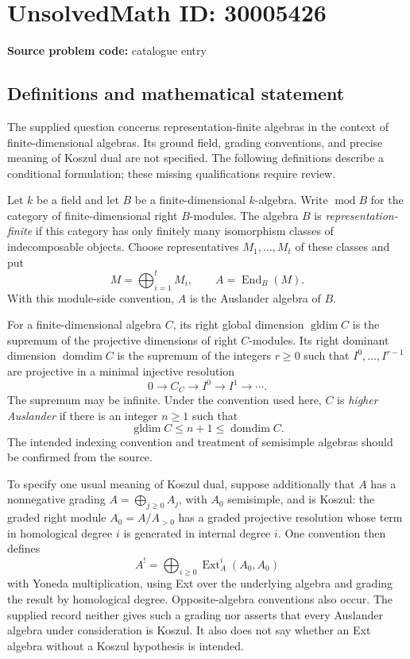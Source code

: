 \documentclass[11pt]{article}
\begin{document}
\section*{UnsolvedMath ID: 30005426}
\textbf{Source problem code:} catalogue entry
\subsection{Definitions and mathematical statement}
The supplied question concerns representation-finite algebras in the context of finite-dimensional algebras. Its ground field, grading conventions, and precise meaning of Koszul dual are not specified. The following definitions describe a conditional formulation; these missing qualifications require review.

Let \(k\) be a field and let \(B\) be a finite-dimensional \(k\)-algebra. Write \(\operatorname{mod}B\) for the category of finite-dimensional right \(B\)-modules. The algebra \(B\) is \emph{representation-finite} if this category has only finitely many isomorphism classes of indecomposable objects. Choose representatives \(M_1,\ldots,M_t\) of these classes and put
\[
M=\bigoplus_{i=1}^{t}M_i,\qquad A=\operatorname{End}_B(M).
\]
With this module-side convention, \(A\) is the Auslander algebra of \(B\).

For a finite-dimensional algebra \(C\), its right global dimension \(\operatorname{gldim}C\) is the supremum of the projective dimensions of right \(C\)-modules. Its right dominant dimension \(\operatorname{domdim}C\) is the supremum of the integers \(r\geq 0\) such that \(I^0,\ldots,I^{r-1}\) are projective in a minimal injective resolution
\[
0\longrightarrow C_C\longrightarrow I^0\longrightarrow I^1\longrightarrow\cdots.
\]
The supremum may be infinite. Under the convention used here, \(C\) is \emph{higher Auslander} if there is an integer \(n\geq 1\) such that
\[
\operatorname{gldim}C\leq n+1\leq\operatorname{domdim}C.
\]
The intended indexing convention and treatment of semisimple algebras should be confirmed from the source.

To specify one usual meaning of Koszul dual, suppose additionally that \(A\) has a nonnegative grading \(A=\bigoplus_{j\geq0}A_j\), with \(A_0\) semisimple, and is Koszul: the graded right module \(A_0=A/A_{>0}\) has a graded projective resolution whose term in homological degree \(i\) is generated in internal degree \(i\). One convention then defines
\[
A^{!}=\bigoplus_{i\geq0}\operatorname{Ext}^{i}_A(A_0,A_0)
\]
with Yoneda multiplication, using Ext over the underlying algebra and grading the result by homological degree. Opposite-algebra conventions also occur. The supplied record neither gives such a grading nor asserts that every Auslander algebra under consideration is Koszul. It also does not say whether an Ext algebra without a Koszul hypothesis is intended.
\end{document}
